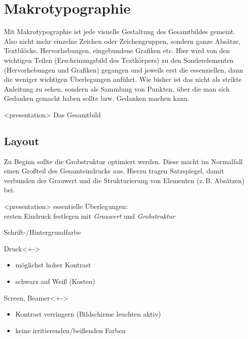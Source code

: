 
\section{Makrotypographie}
Mit Makrotypographie ist jede visuelle Gestaltung des Gesamtbildes
gemeint. Also nicht mehr einzelne Zeichen oder Zeichengruppen, sondern
ganze Absätze, Textblöcke, Hervorhebungen, eingebundene Grafiken etc.
Hier wird von den wichtigen Teilen (Erscheinungsbild des Textkörpers)
zu den Sonderelementen (Hervorhebungen und Grafiken) gegangen und jeweils
erst die essenziellen, dann die weniger wichtigen Überlegungen
anführt.
Wie bisher ist das nicht als strikte Anleitung zu sehen, sondern als
Sammlung von Punkten, über die man sich Gedanken gemacht haben sollte
bzw. Gedanken machen kann.

\begin{frame}<presentation>
  \sectionpage
  \centering
  Das Gesamtbild
\end{frame}

\subsection{Layout}
Zu Beginn sollte die Grobstruktur optimiert werden. Diese macht im
Normalfall einen Großteil des Gesamteindrucks aus. Hierzu tragen
Satzspiegel, damit verbunden der Grauwert und die Strukturierung von
Elementen (z.\,B. Absätzen) bei.
\begin{frame}<presentation>
  \subsectionpage
  \centering
  essentielle Überlegungen: \\
  ersten Eindruck festlegen 
  mit \emph{Grauwert} und \emph{Grobstruktur}
\end{frame}

\begin{frame}{Schrift-/Hintergrundfarbe}
  \begin{block}{Druck}<+->
    \begin{itemize}
    \item möglichst hoher Kontrast%
    \item schwarz auf Weiß (Kosten)
    \end{itemize}
  \end{block}
  \begin{block}{Screen, Beamer}<+->
    \begin{itemize}
    \item Kontrast verringern (Bildschirme leuchten aktiv)
    \item keine irritierenden/beißenden Farben
    \end{itemize}
  \end{block}
\end{frame}

